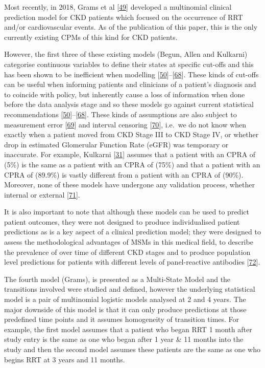 \documentclass[12pt,PhD,twoside,openright]{muthesis}
\begin{document}
Most recently, in 2018, Grams et al {[}\protect\hyperlink{ref-grams_predicting_2018}{49}{]} developed a multinomial clinical prediction model for CKD patients which focused on the occurrence of RRT and/or cardiovascular events. As of the publication of this paper, this is the only currently existing CPMs of this kind for CKD patients.

However, the first three of these existing models (Begun, Allen and Kulkarni) categorise continuous variables to define their states at specific cut-offs and this has been shown to be inefficient when modelling {[}\protect\hyperlink{ref-altman_problems_1994-1}{50}{]}--{[}\protect\hyperlink{ref-weinberg_how_1995}{68}{]}. These kinds of cut-offs can be useful when informing patients and clinicians of a patient's diagnosis and to coincide with policy, but inherently cause a loss of information when done before the data analysis stage and so these models go against current statistical recommendations {[}\protect\hyperlink{ref-altman_problems_1994-1}{50}{]}--{[}\protect\hyperlink{ref-weinberg_how_1995}{68}{]}. These kinds of assumptions are also subject to measurement error {[}\protect\hyperlink{ref-van_smeden_reflection_2019}{69}{]} and interval censoring {[}\protect\hyperlink{ref-sun_interval_2005}{70}{]}, i.e.~we do not know when exactly when a patient moved from CKD Stage III to CKD Stage IV, or whether drop in estimated Glomerular Function Rate (eGFR) was temporary or inaccurate. For example, Kulkarni {[}\protect\hyperlink{ref-kulkarni_transition_2017}{31}{]} assumes that a patient with an CPRA of (5\%) is the same as a patient with an CPRA of (75\%) and that a patient with an CPRA of (89.9\%) is vastly different from a patient with an CPRA of (90\%). Moreover, none of these models have undergone any validation process, whether internal or external {[}\protect\hyperlink{ref-altman_prognosis_2009}{71}{]}.

It is also important to note that although these models can be used to predict patient outcomes, they were not designed to produce individualised patient predictions as is a key aspect of a clinical prediction model; they were designed to assess the methodological advantages of MSMs in this medical field, to describe the prevalence of over time of different CKD stages and to produce population level predictions for patients with different levels of panel-reactive antibodies {[}\protect\hyperlink{ref-royston_prognosis_2009}{72}{]}.

The fourth model (Grams), is presented as a Multi-State Model and the transitions involved were studied and defined, however the underlying statistical model is a pair of multinomial logistic models analysed at 2 and 4 years. The major downside of this model is that it can only produce predictions at those predefined time points and it assumes homogeneity of transition times. For example, the first model assumes that a patient who began RRT 1 month after study entry is the same as one who began after 1 year \& 11 months into the study and then the second model assumes these patients are the same as one who begins RRT at 3 years and 11 months.
\end{document}

